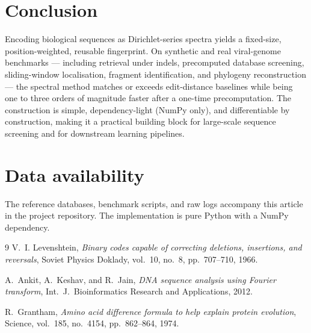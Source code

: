 \documentclass[12pt,a4paper]{article}
\begin{document}
\section{Conclusion}
\label{sec:conclusion}

Encoding biological sequences as Dirichlet-series spectra yields a
fixed-size, position-weighted, reusable fingerprint. On synthetic and
real viral-genome benchmarks --- including retrieval under indels,
precomputed database screening, sliding-window localisation, fragment
identification, and phylogeny reconstruction --- the spectral method
matches or exceeds edit-distance baselines while being one to three
orders of magnitude faster after a one-time precomputation. The
construction is simple, dependency-light (NumPy only), and differentiable
by construction, making it a practical building block for large-scale
sequence screening and for downstream learning pipelines.

\section*{Data availability}

The reference databases, benchmark scripts, and raw logs accompany this
article in the project repository. The implementation is pure Python
with a NumPy dependency.

\begin{thebibliography}{9}
    V.~I. Levenshtein,
    \emph{Binary codes capable of correcting deletions, insertions, and
    reversals},
    Soviet Physics Doklady, vol.~10, no.~8, pp.~707--710, 1966.

    A.~Ankit, A.~Keshav, and R.~Jain,
    \emph{DNA sequence analysis using Fourier transform},
    Int.\ J.\ Bioinformatics Research and Applications, 2012.

    R.~Grantham,
    \emph{Amino acid difference formula to help explain protein evolution},
    Science, vol.~185, no.~4154, pp.~862--864, 1974.
\end{thebibliography}
\end{document}
